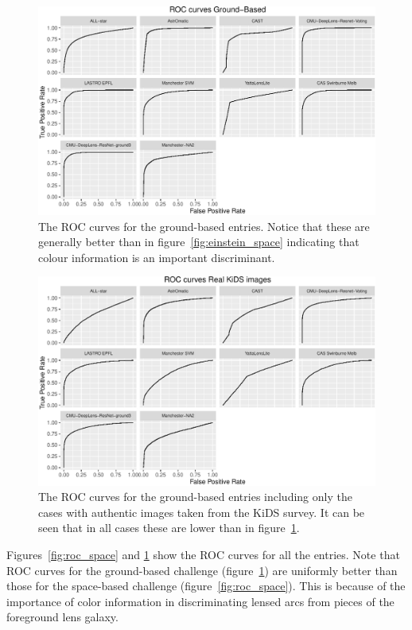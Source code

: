 \documentclass{aa}
\begin{document}
\begin{figure}
 \includegraphics[width=2\columnwidth]{figures/roc_ground.pdf}
 \caption{The ROC curves for the ground-based entries.  Notice that these are generally better than in figure~\ref{fig:einstein_space} indicating that colour information is an important discriminant. }
 \label{fig:roc_ground}
\end{figure}

\begin{figure}
 \includegraphics[width=2\columnwidth]{figures/roc_kids.pdf}
 \caption{The ROC curves for the ground-based entries including only the cases with authentic images taken from the KiDS survey.  It can be seen that in all cases these are lower than in figure~\ref{fig:roc_ground}.}
 \label{fig:roc_kids}
\end{figure}

Figures~\ref{fig:roc_space} and \ref{fig:roc_ground} show the ROC curves for all the entries.  
Note that ROC curves for the ground-based challenge (figure~\ref{fig:roc_ground}) are uniformly better than those for the space-based challenge (figure~\ref{fig:roc_space}).  This is because of the importance of color information in discriminating lensed arcs from pieces of the foreground lens galaxy.
\end{document}
